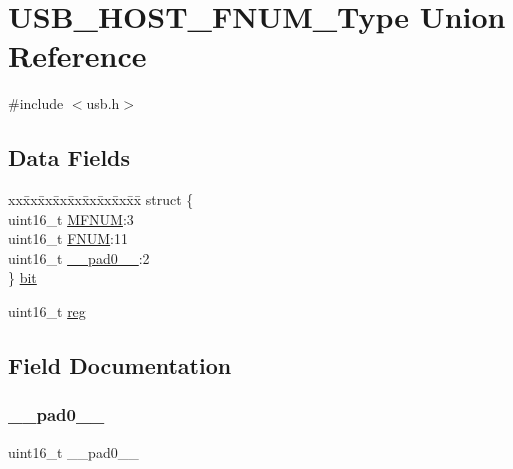 \hypertarget{union_u_s_b___h_o_s_t___f_n_u_m___type}{}\section{U\+S\+B\+\_\+\+H\+O\+S\+T\+\_\+\+F\+N\+U\+M\+\_\+\+Type Union Reference}
\label{union_u_s_b___h_o_s_t___f_n_u_m___type}


{\ttfamily \#include $<$usb.\+h$>$}

\subsection*{Data Fields}
\begin{DoxyCompactItemize}
\item 
\begin{tabbing}
xx\=xx\=xx\=xx\=xx\=xx\=xx\=xx\=xx\=\kill
struct \{\\
\>uint16\_t \mbox{\hyperlink{union_u_s_b___h_o_s_t___f_n_u_m___type_ae1a283990e0aa3baecda4380fb9bf19e}{MFNUM}}:3\\
\>uint16\_t \mbox{\hyperlink{union_u_s_b___h_o_s_t___f_n_u_m___type_a7df8ebe952615d830733f3f183d79dc9}{FNUM}}:11\\
\>uint16\_t \mbox{\hyperlink{union_u_s_b___h_o_s_t___f_n_u_m___type_a77132c2c26a75f5b8751b235cda23828}{\_\_pad0\_\_}}:2\\
\} \mbox{\hyperlink{union_u_s_b___h_o_s_t___f_n_u_m___type_ac8571196e70bc290982fc77f2f00da44}{bit}}\\

\end{tabbing}\item 
uint16\+\_\+t \mbox{\hyperlink{union_u_s_b___h_o_s_t___f_n_u_m___type_a11760f5020019f4aa8cb02e694f7cc44}{reg}}
\end{DoxyCompactItemize}


\subsection{Field Documentation}
\mbox{\label{union_u_s_b___h_o_s_t___f_n_u_m___type_a77132c2c26a75f5b8751b235cda23828}} 
\subsubsection{\texorpdfstring{\_\_pad0\_\_}{\_\_pad0\_\_}}
{\footnotesize\ttfamily uint16\+\_\+t \+\_\+\+\_\+pad0\+\_\+\+\_\+}

